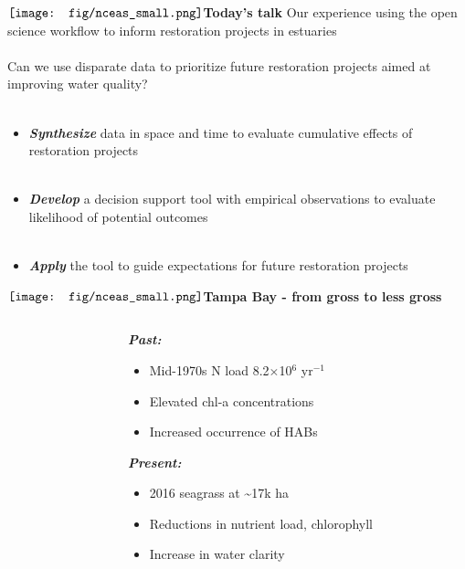 \documentclass[serif]{beamer}\usepackage[]{graphicx}\usepackage[]{color}
\newcommand{\emtxt}[1]{\textbf{\textit{{\color{mypal4} #1}}}}
\begin{document}
\begin{frame}{{$\vcenter{\hbox{\texttt{[image: fig/nceas\_small.png]}}}$\hspace{0.07in}\textbf{Today's talk}}}
\onslide<+->
Our experience using the open science workflow to inform restoration projects in estuaries \\~\\
\onslide<+->
Can we use disparate data to prioritize future restoration projects aimed at improving water quality? \\~\\
\begin{itemize}
\item<+-> \emtxt{Synthesize} data in space and time to evaluate cumulative effects of restoration projects\\~\\
\item<+-> \emtxt{Develop} a decision support tool with empirical observations to evaluate likelihood of potential outcomes \\~\\
\item<+-> \emtxt{Apply} the tool to guide expectations for future restoration projects
\end{itemize}
\end{frame}

\begin{frame}{{$\vcenter{\hbox{\texttt{[image: fig/nceas\_small.png]}}}$\hspace{0.07in}\textbf{Tampa Bay - from gross to less gross}}}
\begin{columns}
\begin{column}{0.5\textwidth}
\onslide<+->
\begin{center}
\\~\\
\\~\\
\end{center}
\end{column}
\begin{column}{0.5\textwidth}
\emtxt{Past:}
\begin{itemize}
\item Mid-1970s N load 8.2$\times$10$^6$ yr$^{-1}$ {\footnotesize \cite{Greening06}}
\item Elevated chl-a concentrations
\item Increased occurrence of HABs
\end{itemize}
\onslide<+->
\emtxt{Present:}
\begin{itemize}
\item 2016 seagrass at \textasciitilde 17k ha {\footnotesize \cite{Sherwood17}}
\item Reductions in nutrient load, chlorophyll
\item Increase in water clarity {\footnotesize \cite{Morrison06,Beck17c}}
\end{itemize}
\end{column}
\end{columns}
\end{frame}
\end{document}
